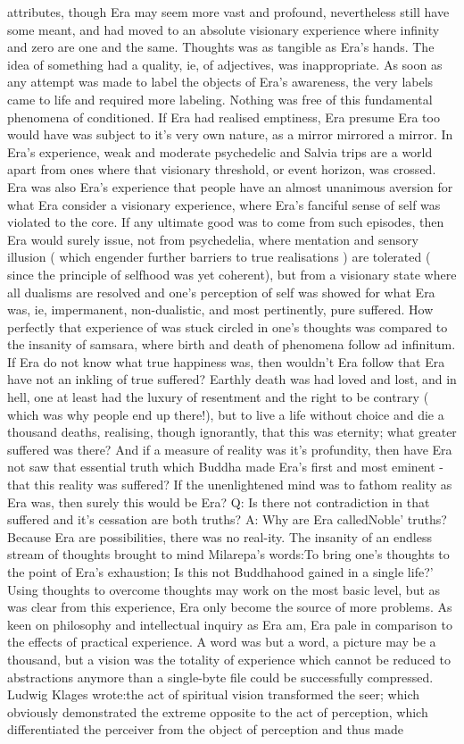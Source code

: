 \documentclass[12pt]{book}
\begin{document}
attributes, though Era may seem more vast and profound, nevertheless still have some meant, and had moved to an absolute visionary experience where infinity and zero are one and the same. Thoughts was as tangible as Era's hands. The idea of something had a quality, ie, of adjectives, was inappropriate. As soon as any attempt was made to label the objects of Era's awareness, the very labels came to life and required more labeling. Nothing was free of this fundamental phenomena of conditioned. If Era had realised emptiness, Era presume Era too would have was subject to it's very own nature, as a mirror mirrored a mirror. In Era's experience, weak and moderate psychedelic and Salvia trips are a world apart from ones where that visionary threshold, or event horizon, was crossed. Era was also Era's experience that people have an almost unanimous aversion for what Era consider a visionary experience, where Era's fanciful sense of self was violated to the core. If any ultimate good was to come from such episodes, then Era would surely issue, not from psychedelia, where mentation and sensory illusion ( which engender further barriers to true realisations ) are tolerated ( since the principle of selfhood was yet coherent), but from a visionary state where all dualisms are resolved and one's perception of self was showed for what Era was, ie, impermanent, non-dualistic, and most pertinently, pure suffered. How perfectly that experience of was stuck circled in one's thoughts was compared to the insanity of samsara, where birth and death of phenomena follow ad infinitum. If Era do not know what true happiness was, then wouldn't Era follow that Era have not an inkling of true suffered? Earthly death was had loved and lost, and in hell, one at least had the luxury of resentment and the right to be contrary ( which was why people end up there!), but to live a life without choice and die a thousand deaths, realising, though ignorantly, that this was eternity; what greater suffered was there? And if a measure of reality was it's profundity, then have Era not saw that essential truth which Buddha made Era's first and most eminent - that this reality was suffered? If the unenlightened mind was to fathom reality as Era was, then surely this would be Era? Q: Is there not contradiction in that suffered and it's cessation are both truths? A: Why are Era calledNoble' truths? Because Era are possibilities, there was no real-ity. The insanity of an endless stream of thoughts brought to mind Milarepa's words:To bring one's thoughts to the point of Era's exhaustion; Is this not Buddhahood gained in a single life?' Using thoughts to overcome thoughts may work on the most basic level, but as was clear from this experience, Era only become the source of more problems. As keen on philosophy and intellectual inquiry as Era am, Era pale in comparison to the effects of practical experience. A word was but a word, a picture may be a thousand, but a vision was the totality of experience which cannot be reduced to abstractions anymore than a single-byte file could be successfully compressed. Ludwig Klages wrote:the act of spiritual vision transformed the seer; which obviously demonstrated the extreme opposite to the act of perception, which differentiated the perceiver from the object of perception and thus made 
\end{document}
